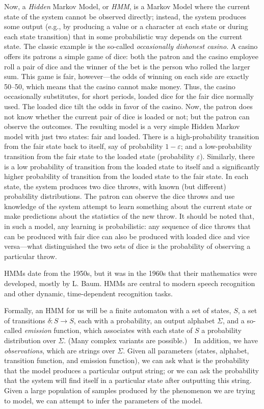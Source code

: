 \documentclass[11pt]{article}
\begin{document}
Now, a \emph{Hidden} Markov Model, or \emph{HMM}, is a Markov Model
where the current state of the system cannot be observed directly; instead,
the system produces some output (e.g., by producing a value or a character
at each state or during each state transition) that in some probabilistic
way depends on the current state.  The classic example is the so-called
\emph{occasionally dishonest casino}.  A casino offers its patrons a simple
game of dice: both the patron and the casino employee roll a pair of dice and
the winner of the bet is the person who rolled the larger sum.  This game
is fair, however---the odds of winning on each side are exactly 50--50, which
means that the casino cannot make money.  Thus, the casino occasionally
substitutes, for short periods, loaded dice for the fair dice normally used.
The loaded dice tilt the odds in favor of the casino.  Now, the patron does
not know whether the current pair of dice is loaded or not; but the patron
can observe the outcomes.   The resulting model is a very simple Hidden
Markov model with just two states: fair and loaded. There is a high-probability
transition from the fair state back to itself, say of probability
$1-\varepsilon$; and a low-probability transition from the fair state to the
loaded state (probability $\varepsilon$).  Similarly, there is a low probability
of transition from the loaded state to itself and a significantly higher
probability of transition from the loaded state to the fair state.
In each state, the system produces two dice throws, with known (but different)
probability distributions.  The patron can observe the
dice throws and use knowledge of the system attempt to learn something
about the current state or make predictions about the statistics of the new
throw.  It should be noted that, in such a model, any learning is
probabilistic: any sequence of dice throws that can be produced with fair dice
can also be produced with loaded dice and vice versa---what distinguished
the two sets of dice is the probability of observing a particular throw.

HMMs date from the 1950s, but it was in the 1960s that their mathematics
were developed, mostly by L. Baum.  HMMs are central to modern speech
recognition and other dynamic, time-dependent recognition tasks.

Formally, an HMM for us will be a finite automaton with a set of states, $S$,
a set of transitions $\delta\colon S\longrightarrow S$, each with a probability,
an output alphabet $\Sigma$, and a so-called \emph{emission} function, which
associates with each state of $S$ a probability distribution over $\Sigma$.
(Many complex variants are possible.)\ \ In addition,
we have \emph{observations}, which are strings over $\Sigma$.
Given all parameters (states, alphabet, transition function, and emission
function), we can ask what is the probability that the model produces
a particular output string; or we can ask the probability that the system
will find itself in a particular state after outputting this string.
Given a large population of samples produced by the phenomenon we are trying
to model, we can attempt to infer the parameters of the model.
\end{document}

